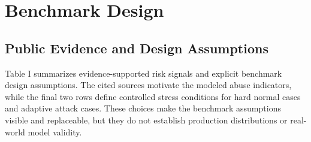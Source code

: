 \documentclass[conference]{IEEEtran}
\begin{document}
\section{Benchmark Design}

\subsection{Public Evidence and Design Assumptions}

Table I summarizes evidence-supported risk signals and explicit benchmark design assumptions. The cited sources motivate the modeled abuse indicators, while the final two rows define controlled stress conditions for hard normal cases and adaptive attack cases. These choices make the benchmark assumptions visible and replaceable, but they do not establish production distributions or real-world model validity.
\end{document}
